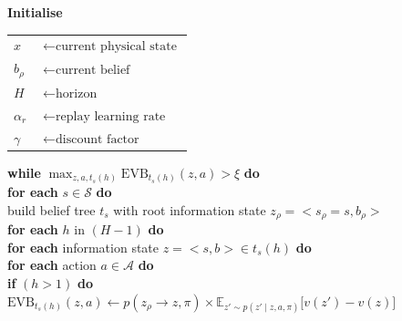 \documentclass{article}
\begin{document}
\textbf{Initialise}\\ 
\begin{tabular}{ll}
    $x$ & $\leftarrow \text{current physical state}$\\
    $b_{\rho}$ & $\leftarrow \text{current belief}$ \\
    $H$ & $\leftarrow \text{horizon}$\\ 
    $\alpha_r$ & $\leftarrow \text{replay learning rate}$\\
    $\gamma$ & $\leftarrow \text{discount factor}$    
\end{tabular}

\bigbreak
\textbf{while} $\max_{z, a, t_{s}(h)} \text{EVB}_{t_{s}(h)}(z, a) > \xi$ \textbf{do}\\
\hspace*{0.5cm} \textbf{for each} $s \in \mathcal{S}$ \textbf{do} \\
\hspace*{0.5cm} \hspace*{0.5cm} build belief tree $t_s$ with root information state $z_{\rho}=<s_{\rho}=s, b_{\rho}>$\\
\hspace*{0.5cm} \hspace*{0.5cm} \textbf{for each} $h$ in $(H-1)$ \textbf{do}\\
\hspace*{0.5cm} \hspace*{0.5cm} \hspace*{0.5cm} \textbf{for each} information state $z=<s, b> \in t_s(h)$ \textbf{do}\\
\hspace*{0.5cm} \hspace*{0.5cm} \hspace*{0.5cm} \hspace*{0.5cm} \textbf{for each} action $a\in \mathcal{A}$ \textbf{do}\\
\hspace*{0.5cm} \hspace*{0.5cm} \hspace*{0.5cm} \hspace*{0.5cm} \hspace*{0.5cm} \textbf{if} $(h > 1)$ \textbf{do}\\
\hspace*{0.5cm} \hspace*{0.5cm} \hspace*{0.5cm} \hspace*{0.5cm} \hspace*{0.5cm} \hspace*{0.5cm} $\text{EVB}_{t_{s}(h)}(z, a) \leftarrow p(z_{\rho} \rightarrow z, \pi) \times \mathbb{E}_{z' \sim p(z' \mid z, a, \pi)}\big[v(z')-v(z)\big]$\\
\end{document}
